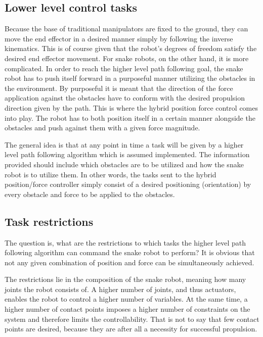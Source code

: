 \subsection{Lower level control tasks}

Because the base of traditional manipulators are fixed to the ground, they can move the end effector in a desired manner simply by following the inverse kinematics. This is of course given that the robot's degrees of freedom satisfy the desired end effector movement. For snake robots, on the other hand, it is more complicated.
In order to reach the higher level path following goal, the snake robot has to push itself forward in a purposeful manner utilizing the obstacles in the environment. By purposeful it is meant that the direction of the force application against the obstacles have to conform with the desired propulsion direction given by the path. This is where the hybrid position force control comes into play. The robot has to both position itself in a certain manner alongside the obstacles and push against them with a given force magnitude.

The general idea is that at any point in time a task will be given by a higher level path following algorithm which is assumed implemented. The information provided should include which obstacles are to be utilized and how the snake robot is to utilize them. In other words, the tasks sent to the hybrid position/force controller simply consist of a desired positioning (orientation) by every obstacle and force to be applied to the obstacles.



\subsection{Task restrictions}\label{subsec:task-restrictions}

The question is, what are the restrictions to which tasks the higher level path following algorithm can command the snake robot to perform? It is obvious that not any given combination of position and force can be simultaneously achieved.

The restrictions lie in the composition of the snake robot, meaning how many joints the robot consists of. A higher number of joints, and thus actuators, enables the robot to control a higher number of variables. At the same time, a higher number of contact points imposes a higher number of constraints on the system and therefore limits the controllability. That is not to say that few contact points are desired, because they are after all a necessity for successful propulsion.

